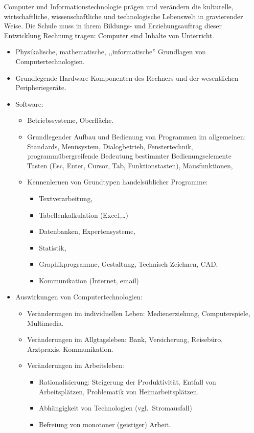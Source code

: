 Computer und Informationstechnologie pr\"{a}gen und ver\"{a}ndern die kulturelle,
wirtschaftliche, wissenschaftliche und technologische Lebenswelt
in gravierender Weise. Die Schule muss in ihrem Bildungs- und
Erziehungsauftrag dieser Entwicklung Rechnung tragen:
\mip
Computer sind Inhalte von Unterricht.
\begin{itemize}
\item Physikalische, mathematische, ,,informatische'' Grundlagen von Computertechnologien.
\item Grundlegende Hardware-Komponenten des Rechners und der wesentlichen Peripherieger\"{a}te.
\item Software:
\begin{itemize}
\item
Betriebssysteme, Oberfl\"{a}che.
\item
Grundlegender Aufbau und Bedienung von Programmen im allgemeinen:
Standards, Men\"{u}system, Dialogbetrieb, Fenstertechnik,
programm\"{u}bergreifende Bedeutung bestimmter Bedienungselemente
Tasten (Esc, Enter, Cursor, Tab, Funktionstasten), Mausfunktionen,
\item
Kennenlernen von Grundtypen handels\"{u}blicher Programme:
\begin{itemize}
\item Textverarbeitung,
\item Tabellenkalkulation (Excel,\dots)
\item Datenbanken, Expertensysteme,
\item Statistik,
\item Graphikprogramme, Gestaltung, Technisch Zeichnen, CAD,
\item Kommunikation (Internet, email)
\end{itemize}
\end{itemize}

\item Auswirkungen von Computertechnologien:
\begin{itemize}
\item Ver\"{a}nderungen im individuellen Leben: Medienerziehung, Computerspiele, Multimedia.
\item Ver\"{a}nderungen im Allgtagsleben: Bank, Versicherung, Reiseb\"{u}ro, Arztpraxis, Kommunikation.

\item Ver\"{a}nderungen im Arbeitsleben:
\begin{itemize}
\item
Rationalisierung: Steigerung der Produktivit\"{a}t, Entfall von
Arbeitspl\"{a}tzen, Problematik von Heimarbeitspl\"{a}tzen.
\item
Abh\"{a}ngigkeit von Technologien (vgl.\ Stromausfall)
\item
Befreiung von monotoner (geistiger) Arbeit.
\end{itemize}


\end{itemize}
\end{itemize}
